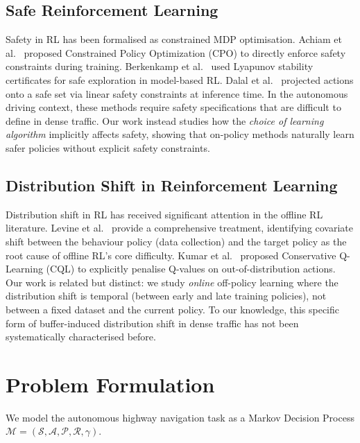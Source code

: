 \documentclass[conference]{IEEEtran}
\begin{document}
\subsection{Safe Reinforcement Learning}

Safety in RL has been formalised as constrained MDP optimisation. Achiam et
al.~\cite{achiam2017constrained} proposed Constrained Policy Optimization (CPO) to
directly enforce safety constraints during training. Berkenkamp et
al.~\cite{berkenkamp2017safe} used Lyapunov stability certificates for safe
exploration in model-based RL. Dalal et al.~\cite{dalal2018safe} projected actions
onto a safe set via linear safety constraints at inference time.
In the autonomous driving context, these methods require safety specifications that
are difficult to define in dense traffic. Our work instead studies how the \emph{choice
of learning algorithm} implicitly affects safety, showing that on-policy methods
naturally learn safer policies without explicit safety constraints.

\subsection{Distribution Shift in Reinforcement Learning}

Distribution shift in RL has received significant attention in the offline RL
literature. Levine et al.~\cite{levine2020offline} provide a comprehensive treatment,
identifying covariate shift between the behaviour policy (data collection) and the
target policy as the root cause of offline RL's core difficulty. Kumar et
al.~\cite{kumar2020conservative} proposed Conservative Q-Learning (CQL) to explicitly
penalise Q-values on out-of-distribution actions. Our work is related but distinct:
we study \emph{online} off-policy learning where the distribution shift is temporal
(between early and late training policies), not between a fixed dataset and the current
policy. To our knowledge, this specific form of buffer-induced distribution shift in
dense traffic has not been systematically characterised before.

\section{Problem Formulation}

We model the autonomous highway navigation task as a Markov Decision Process
$\mathcal{M} = (\mathcal{S}, \mathcal{A}, \mathcal{P}, \mathcal{R}, \gamma)$.
\end{document}
